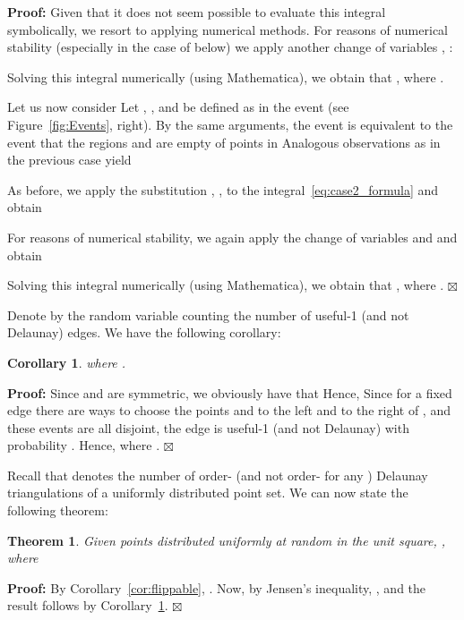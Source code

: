 \documentclass {journal}
\newtheorem {theorem} {Theorem}
\newtheorem {corollary} {Corollary}
\newenvironment {proof}{\textbf {Proof:}}{\hfill \ensuremath {\boxtimes}}
\begin{document}
\begin{proof}
Given that it does not seem possible to evaluate this integral
symbolically, we resort to applying numerical methods. For reasons
of numerical stability (especially in the case of
 below) we apply another change of variables
, :



Solving this integral numerically (using Mathematica), we obtain
that , where .

Let us now consider  Let , ,  and
 be defined as in the event  (see
Figure~\ref{fig:Events}, right). By the same arguments, the event
 is equivalent to the event that the regions 
  and  are empty of points in  Analogous
observations as in the previous case yield



As before, we apply the substitution ,
,  to the
integral~\eqref{eq:case2_formula} and obtain



For reasons of numerical stability, we again apply the change of
variables  and
 and obtain


Solving this integral numerically (using Mathematica), we obtain
that  , where .
\end{proof}

Denote by  the random variable counting the number of
useful-1 (and not Delaunay) edges. We have the following
corollary:
\begin{corollary}\label{cor:useful_1}
 where .
\end{corollary}
\begin{proof}
Since  and  are symmetric, we
obviously have that 
Hence,  Since for a
fixed edge  there are  ways to
choose the points  and  to the left and to the right of
, and these events are all disjoint, the edge
 is useful-1 (and not Delaunay) with probability
. Hence,  where .
\end{proof}

Recall that  denotes the number of order- (and not
order- for any ) Delaunay triangulations of a uniformly
distributed point set. We can now state the following theorem:

\begin{theorem}\label{thm:triangulations1}
Given  points distributed uniformly at random in the unit
square, , where 
\end{theorem}
\begin{proof}
By Corollary~\ref{cor:flippable}, . Now, by
Jensen's inequality, , and the
result follows by Corollary~\ref{cor:useful_1}.
\end{proof}
\end{document}
